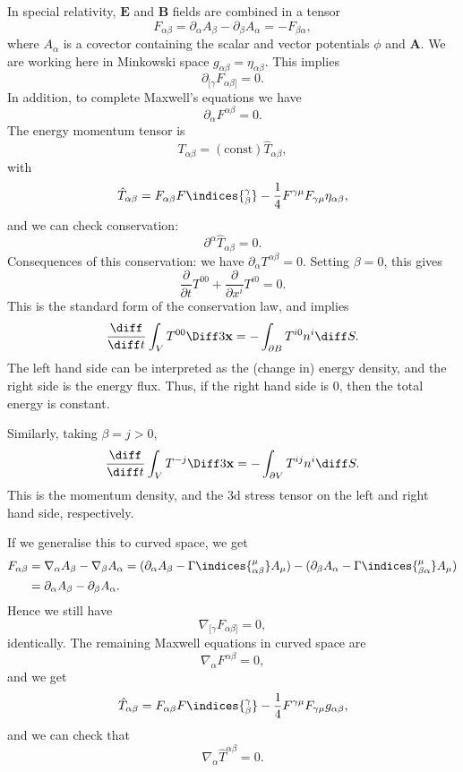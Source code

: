 \documentclass[12pt]{article}
\begin{document}
\begin{exbox}[Electromagnetism]
	In special relativity, $\mathbf{E}$ and $\mathbf{B}$ fields are combined in a tensor
	\[
	F_{\alpha\beta} = \partial_\alpha A_\beta - \partial_\beta A_\alpha = - F_{\beta\alpha},
	\]
	where $A_\alpha$ is a covector containing the scalar and vector potentials $\phi$ and $\mathbf{A}$. We are working here in Minkowski space $g_{\alpha\beta} = \eta_{\alpha\beta}$. This implies
	\[
		\partial_{[\gamma} F_{\alpha\beta]} = 0.
	\]
	In addition, to complete Maxwell's equations we have
	\[
	\partial_\alpha F^{\alpha\beta} = 0.
	\]
	The energy momentum tensor is
	\[
		T_{\alpha\beta} = (\text{const}) \hat T_{\alpha\beta},
	\]
	with
	\[
	\hat T_{\alpha\beta} = F_{\alpha\beta} F\indices{_{\beta}^\gamma} - \frac{1}{4} F^{\gamma\mu} F_{\gamma\mu} \eta_{\alpha\beta},
	\]
	and we can check conservation:
	\[
	\partial^\alpha \hat T_{\alpha\beta} = 0.
	\]
	Consequences of this conservation: we have $\partial_\alpha T^{\alpha\beta} = 0$. Setting $\beta = 0$, this gives
	\[
	\frac{\partial}{\partial t} T^{00} + \frac{\partial}{\partial x^i} T^{i0} = 0.
	\]
	This is the standard form of the conservation law, and implies
	\[
	\frac{\diff}{\diff t} \int_V T^{00}\Diff3 \mathbf{x} = - \int_{\partial B} T^{i0}n^i \diff S.
	\]
	The left hand side can be interpreted as the (change in) energy density, and the right side is the energy flux. Thus, if the right hand side is $0$, then the total energy is constant.

	Similarly, taking $\beta = j > 0$,
	\[
	\frac{\diff}{\diff t} \int_V T^{-j} \Diff3 \mathbf{x} = - \int_{\partial V} T^{ij} n^i \diff S.
	\]
	This is the momentum density, and the 3d stress tensor on the left and right hand side, respectively.
\end{exbox}

If we generalise this to curved space, we get
\begin{align*}
	F_{\alpha\beta} &= \nabla_\alpha A_\beta - \nabla_\beta A_\alpha = (\partial_\alpha A_\beta - \Gamma\indices{^{\mu}_{\alpha\beta}} A_\mu) - (\partial_\beta A_\alpha - \Gamma\indices{^{\mu}_{\beta\alpha}} A_\mu) \\
			&= \partial_\alpha A_\beta - \partial_\beta A_\alpha.
\end{align*}
Hence we still have
\[
	\nabla_{[\gamma} F_{\alpha\beta]} = 0,
\]
identically. The remaining Maxwell equations in curved space are
\[
\nabla_\alpha F^{\alpha\beta} = 0,
\]
and we get
\[
	\hat T_{\alpha\beta} = F_{\alpha\beta} F\indices{_\beta^\gamma} - \frac{1}{4} F^{\gamma\mu} F_{\gamma\mu} g_{\alpha\beta},
\]
and we can check that
\[
\nabla_\alpha \hat T^{\alpha\beta} = 0.
\]
\end{document}
